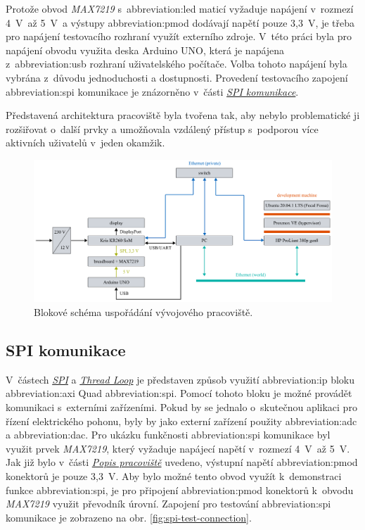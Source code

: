 \documentclass[a4paper, twoside, 11pt]{article}
\newcommand{\fbar}{\FloatBarrier}
\begin{document}
	Protože obvod \textit{MAX7219} s~\gls{abbreviation:led} maticí vyžaduje napájení v~rozmezí 4~V~až 5~V~a výstupy \gls{abbreviation:pmod} dodávají napětí pouze 3,3~V, je třeba pro napájení testovacího rozhraní využít externího zdroje. V~této práci byla pro napájení obvodu využita deska Arduino UNO, která je napájena z~\gls{abbreviation:usb} rozhraní uživatelského počítače. Volba tohoto napájení byla vybrána z~důvodu jednoduchosti a dostupnosti. Provedení testovacího zapojení \gls{abbreviation:spi} komunikace je znázorněno v~části \hyperref[subsec:spi-komunikace]{\textit{SPI komunikace}}.\par
	Představená architektura pracoviště byla tvořena tak, aby nebylo problematické ji rozšiřovat o~další prvky a umožňovala vzdálený přístup s~podporou více aktivních uživatelů v~jeden okamžik.


\begin{figure}[htbp!]
	\centering
	\includegraphics[width=1\textwidth]{src/pdf/workspace-scheme.pdf}
	\caption{Blokové schéma uspořádání vývojového pracoviště.}
	\label{fig:workspace-scheme}
\end{figure}

	\fbar
	\subsection{SPI komunikace}\label{subsec:spi-komunikace}
	V~částech \hyperref[subsec:spi]{\textit{SPI}} a \hyperref[subsubsec:thread-loop]{\textit{Thread Loop}} je představen způsob využití \gls{abbreviation:ip} bloku \gls{abbreviation:axi} Quad \gls{abbreviation:spi}. Pomocí tohoto bloku je možné provádět komunikaci s~externími zařízeními. Pokud by se jednalo o~skutečnou aplikaci pro řízení elektrického pohonu, byly by jako externí zařízení použity \gls{abbreviation:adc} a \gls{abbreviation:dac}. Pro ukázku funkčnosti \gls{abbreviation:spi} komunikace byl využit prvek \textit{MAX7219}, který vyžaduje napájecí napětí v~rozmezí 4~V~až 5~V. Jak již bylo v~části \hyperref[sec:popis-pracoviste]{\textit{Popis pracoviště}} uvedeno, výstupní napětí \gls{abbreviation:pmod} konektorů je pouze 3,3~V. Aby bylo možné tento obvod využít k~demonstraci funkce \gls{abbreviation:spi}, je pro připojení \gls{abbreviation:pmod} konektorů k~obvodu \textit{MAX7219} využit převodník úrovní. Zapojení pro testování \gls{abbreviation:spi} komunikace je zobrazeno na obr. \ref{fig:spi-test-connection}.\par
\end{document}
